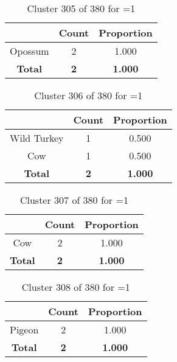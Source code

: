 \begin{table}[ht!]
\centering
\begin{tabular}{|c|c|c|}
\hline
\bf \Spec{} &\bf Count &\bf Proportion\\ \hline \hline
Opossum & 2 & 1.000\\ \hline
\hline
\bf Total & \bf 2 & \bf 1.000\\ \hline
\end{tabular}
\label{tab:cluster:305:1}
\caption{Cluster 305 of 380 for \minneigh{}=1}
\end{table}

\begin{table}[ht!]
\centering
\begin{tabular}{|c|c|c|}
\hline
\bf \Spec{} &\bf Count &\bf Proportion\\ \hline \hline
Wild Turkey & 1 & 0.500\\ \hline
Cow & 1 & 0.500\\ \hline
\hline
\bf Total & \bf 2 & \bf 1.000\\ \hline
\end{tabular}
\label{tab:cluster:306:1}
\caption{Cluster 306 of 380 for \minneigh{}=1}
\end{table}

\begin{table}[ht!]
\centering
\begin{tabular}{|c|c|c|}
\hline
\bf \Spec{} &\bf Count &\bf Proportion\\ \hline \hline
Cow & 2 & 1.000\\ \hline
\hline
\bf Total & \bf 2 & \bf 1.000\\ \hline
\end{tabular}
\label{tab:cluster:307:1}
\caption{Cluster 307 of 380 for \minneigh{}=1}
\end{table}

\begin{table}[ht!]
\centering
\begin{tabular}{|c|c|c|}
\hline
\bf \Spec{} &\bf Count &\bf Proportion\\ \hline \hline
Pigeon & 2 & 1.000\\ \hline
\hline
\bf Total & \bf 2 & \bf 1.000\\ \hline
\end{tabular}
\label{tab:cluster:308:1}
\caption{Cluster 308 of 380 for \minneigh{}=1}
\end{table}

